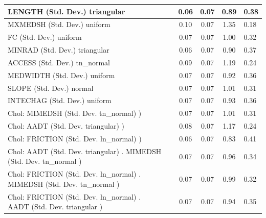 \begin{table}
\begin{center}
\begin{tabular}{|l|l|c|c|c|l|}
			\hline
			LENGTH (Std. Dev.) triangular &  & 0.06 & 0.07 & 0.89 & 0.38 \\
			\hline
			MXMEDSH (Std. Dev.) uniform &  & 0.10 & 0.07 & 1.35 & 0.18 \\
			\hline
			FC (Std. Dev.) uniform &  & 0.07 & 0.07 & 1.00 & 0.32 \\
			\hline
			MINRAD (Std. Dev.) triangular &  & 0.06 & 0.07 & 0.90 & 0.37 \\
			\hline
			ACCESS (Std. Dev.) tn_normal &  & 0.09 & 0.07 & 1.19 & 0.24 \\
			\hline
			MEDWIDTH (Std. Dev.) uniform &  & 0.07 & 0.07 & 0.92 & 0.36 \\
			\hline
			SLOPE (Std. Dev.) normal &  & 0.07 & 0.07 & 1.01 & 0.31 \\
			\hline
			INTECHAG (Std. Dev.) uniform &  & 0.07 & 0.07 & 0.93 & 0.36 \\
			\hline
			 Chol: MIMEDSH (Std. Dev. tn_normal) ) &  & 0.07 & 0.07 & 1.01 & 0.31 \\
			\hline
			 Chol: AADT (Std. Dev. triangular) ) &  & 0.08 & 0.07 & 1.17 & 0.24 \\
			\hline
			 Chol: FRICTION (Std. Dev. ln_normal) ) &  & 0.06 & 0.07 & 0.83 & 0.41 \\
			\hline
			 Chol: AADT (Std. Dev. triangular) . MIMEDSH (Std. Dev.   tn_normal ) &  & 0.07 & 0.07 & 0.96 & 0.34 \\
			\hline
			 Chol: FRICTION (Std. Dev. ln_normal) . MIMEDSH (Std. Dev.   tn_normal ) &  & 0.07 & 0.07 & 0.99 & 0.32 \\
			\hline
			 Chol: FRICTION (Std. Dev. ln_normal) . AADT (Std. Dev.   triangular ) &  & 0.07 & 0.07 & 0.94 & 0.35 \\
			\hline
		\end{tabular}
	\end{center}
\end{table}